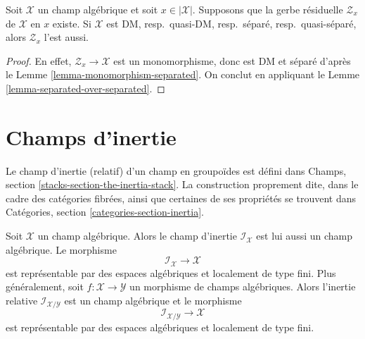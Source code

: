 \begin{lemma}
\label{lemma-separation-properties-residual-gerbe}
Soit $\mathcal{X}$ un champ algébrique et soit $x \in |\mathcal{X}|$.
Supposons que la gerbe résiduelle $\mathcal{Z}_x$ de $\mathcal{X}$ en $x$
existe. Si $\mathcal{X}$ est DM, resp.\ quasi-DM, resp.\ séparé, resp.\
quasi-séparé, alors $\mathcal{Z}_x$ l'est aussi.
\end{lemma}

\begin{proof}
En effet, $\mathcal{Z}_x \to \mathcal{X}$ est un monomorphisme, donc est
DM et séparé d'après le Lemme \ref{lemma-monomorphism-separated}.
On conclut en appliquant le Lemme \ref{lemma-separated-over-separated}.
\end{proof}


















\section{Champs d'inertie}
\label{section-inertia}

\noindent
Le champ d'inertie (relatif) d'un champ en groupoïdes est défini dans
Champs, section \ref{stacks-section-the-inertia-stack}.
La construction proprement dite, dans le cadre des catégories fibrées, ainsi
que certaines de ses propriétés se trouvent dans Catégories, section
\ref{categories-section-inertia}.

\begin{lemma}
\label{lemma-inertia}
Soit $\mathcal{X}$ un champ algébrique. Alors le champ d'inertie
$\mathcal{I}_\mathcal{X}$ est lui aussi un champ algébrique. Le morphisme
$$
\mathcal{I}_\mathcal{X} \longrightarrow \mathcal{X}
$$
est représentable par des espaces algébriques et localement de type fini.
Plus généralement, soit $f : \mathcal{X} \to \mathcal{Y}$ un morphisme de
champs algébriques. Alors l'inertie relative
$\mathcal{I}_{\mathcal{X}/\mathcal{Y}}$ est un champ algébrique et le
morphisme
$$
\mathcal{I}_{\mathcal{X}/\mathcal{Y}} \longrightarrow \mathcal{X}
$$
est représentable par des espaces algébriques et localement de type fini.
\end{lemma}

